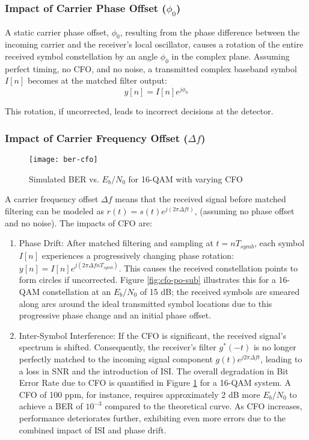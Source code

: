 \subsubsection{Impact of Carrier Phase Offset ($\phi_0$)}
A static carrier phase offset, $\phi_0$, resulting from the phase difference between the incoming carrier and the receiver's local oscillator, causes a rotation of the entire received symbol constellation by an angle $\phi_0$ in the complex plane. Assuming perfect timing, no CFO, and no noise, a transmitted complex baseband symbol $I[n]$ becomes at the matched filter output:
\begin{equation}
	y[n] = I[n]e^{j\phi_0}
\end{equation}
\par
This rotation, if uncorrected, leads to incorrect decisions at the detector.

\subsubsection{Impact of Carrier Frequency Offset ($\Delta f$)}
\begin{figure}[H]
    \centering
    \texttt{[image: ber-cfo]}
    \caption{Simulated BER vs. $E_b/N_0$ for 16-QAM with varying CFO}
    \label{fig:ber-cfo}
\end{figure}
A carrier frequency offset $\Delta f$ means that the received signal before matched filtering can be modeled as $r(t) = s(t) e^{j(2\pi \Delta f t)}$, (assuming no phase offset and no noise). The impacts of CFO are:
\begin{enumerate}
    \item Phase Drift: After matched filtering and sampling at $t = nT_{symb}$, each symbol $I[n]$ experiences a progressively changing phase rotation: $y[n] = I[n] e^{j(2\pi \Delta f nT_{symb})}$. This causes the received constellation points to form circles if uncorrected. Figure \ref{fig:cfo-po-sub} illustrates this for a 16-QAM constellation at an $E_b/N_0$ of 15 dB; the received symbols are smeared along arcs around the ideal transmitted symbol locations due to this progressive phase change and an initial phase offset.
    \item Inter-Symbol Interference: If the CFO is significant, the received signal's spectrum is shifted. Consequently, the receiver's filter $g^*(-t)$ is no longer perfectly matched to the incoming signal component $g(t)e^{j2\pi \Delta f t}$, leading to a loss in SNR and the introduction of ISI. The overall degradation in Bit Error Rate due to CFO is quantified in Figure \ref{fig:ber-cfo} for a 16-QAM system. A CFO of 100 ppm, for instance, requires approximately 2 dB more $E_b/N_0$ to achieve a BER of $10^{-3}$ compared to the theoretical curve. As CFO increases, performance deteriorates further, exhibiting even more errors due to the combined impact of ISI and phase drift.
\end{enumerate}

